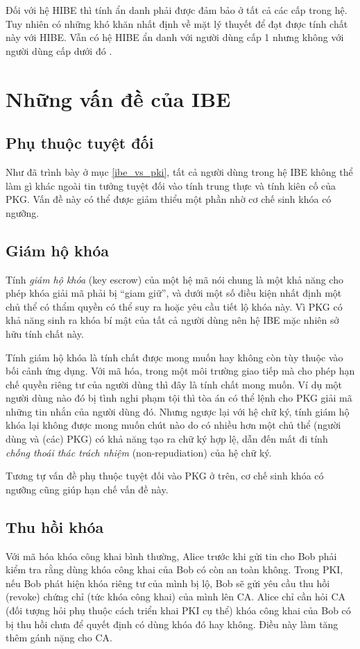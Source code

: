 \documentclass[class=report, crop=false]{standalone}
\begin{document}
			Đối với hệ HIBE thì tính ẩn danh phải được đảm bảo ở tất cả các cấp trong hệ. Tuy nhiên có những khó khăn nhất định về mặt lý thuyết để đạt được tính chất này với HIBE. Vẫn có hệ HIBE ẩn danh với người dùng cấp 1 nhưng không với người dùng cấp dưới đó \cite{DBLP:conf/asiacrypt/GentryS02}.
	\section{Những vấn đề của IBE}
		\subsection{Phụ thuộc tuyệt đối}
			Như đã trình bày ở mục \ref{ibe_vs_pki}, tất cả người dùng trong hệ IBE không thể làm gì khác ngoài tin tưởng tuyệt đối vào tính trung thực và tính kiên cố của PKG. Vấn đề này có thể được giảm thiểu một phần nhờ cơ chế sinh khóa có ngưỡng.
		\subsection{Giám hộ khóa}
			Tính \textit{giám hộ khóa} (key escrow) của một hệ mã nói chung là một khả năng cho phép khóa giải mã phải bị ``giam giữ'', và dưới một số điều kiện nhất định một chủ thể có thẩm quyền có thể suy ra hoặc yêu cầu tiết lộ khóa này. Vì PKG có khả năng sinh ra khóa bí mật của tất cả người dùng nên hệ IBE mặc nhiên sở hữu tính chất này.

			Tính giám hộ khóa là tính chất được mong muốn hay không còn tùy thuộc vào bối cảnh ứng dụng. Với mã hóa, trong một môi trường giao tiếp mà cho phép hạn chế quyền riêng tư của người dùng thì đây là tính chất mong muốn. Ví dụ một người dùng nào đó bị tình nghi phạm tội thì tòa án có thể lệnh cho PKG giải mã những tin nhắn của người dùng đó. Nhưng ngược lại với hệ chữ ký, tính giám hộ khóa lại không được mong muốn chút nào do có nhiều hơn một chủ thể (người dùng và (các) PKG) có khả năng tạo ra chữ ký hợp lệ, dẫn đến mất đi tính \textit{chống thoái thác trách nhiệm} (non-repudiation) của hệ chữ ký.

			Tương tự vấn đề phụ thuộc tuyệt đối vào PKG ở trên, cơ chế sinh khóa có ngưỡng cũng giúp hạn chế vấn đề này.
		\subsection{Thu hồi khóa}
			Với mã hóa khóa công khai bình thường, Alice trước khi gửi tin cho Bob phải kiểm tra rằng dùng khóa công khai của Bob có còn an toàn không. Trong PKI, nếu Bob phát hiện khóa riêng tư của mình bị lộ, Bob sẽ gửi yêu cầu thu hồi (revoke) chứng chỉ (tức khóa công khai) của mình lên CA. Alice chỉ cần hỏi CA (đối tượng hỏi phụ thuộc cách triển khai PKI cụ thể) khóa công khai của Bob có bị thu hồi chưa để quyết định có dùng khóa đó hay không. Điều này làm tăng thêm gánh nặng cho CA.
\end{document}

